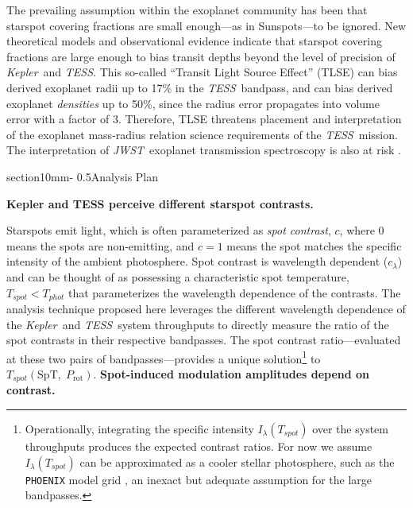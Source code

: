 \documentclass[letterpaper,12pt]{article}
\makeatletter
\renewcommand{\section}{\@startsection%
{section}{1}{0mm}{-\baselineskip}%
{0.5\baselineskip}{\normalfont\Large\bfseries}}%
\newcommand{\tess}{{\it TESS}}
\newcommand{\jwst}{{\it JWST}}
\newcommand{\kepler}{{\it Kepler}}
\makeatother
\begin{document}
The prevailing assumption within the exoplanet community has been that starspot covering fractions are small enough---as in Sunspots---to be ignored.  New theoretical models \cite{2018ApJ...853..122R} and observational evidence \cite{2016MNRAS.463.2494F} indicate that starspot covering fractions are large enough to bias transit depths beyond the level of precision of \kepler\ and \tess.  This so-called ``Transit Light Source Effect'' (TLSE) can bias derived exoplanet radii up to 17\% in the \tess\ bandpass, and can bias derived exoplanet \emph{densities} up to 50\%, since the radius error propagates into volume error with a factor of 3.  Therefore, TLSE threatens placement and interpretation of the exoplanet mass-radius relation science requirements of the \tess\ mission.  The interpretation of \jwst\ exoplanet transmission spectroscopy is also at risk \cite{2019AJ....157...11W}.

\section{Analysis Plan}

\textbf{Kepler and TESS perceive different starspot contrasts.}

Starspots emit light, which is often parameterized as \emph{spot contrast}, $c$, where 0 means the spots are non-emitting, and $c=1$ means the spot matches the specific intensity of the ambient photosphere.  Spot contrast is wavelength dependent ($c_\lambda$) and can be thought of as possessing a characteristic spot temperature, $T_{spot}<T_{phot}$ that parameterizes the wavelength dependence of the contrasts.  The analysis technique proposed here leverages the different wavelength dependence of the \kepler\ and \tess\ system throughputs to directly measure the ratio of the spot contrasts in their respective bandpasses.  The spot contrast ratio---evaluated at these two pairs of bandpasses---provides a unique solution\footnote{Operationally, integrating the specific intensity $I_\lambda(T_{spot})$ over the system throughputs produces the expected contrast ratios.  For now we assume $I_\lambda(T_{spot})$ can be approximated as a cooler stellar photosphere, such as the \texttt{PHOENIX} model grid \cite{2013A&A...553A...6H}, an inexact but adequate assumption for the large bandpasses.} to $T_{spot}(\mathrm{SpT},\;P_{\mathrm{rot}})$.  \newline \newline
\textbf{Spot-induced modulation amplitudes depend on contrast.}
\end{document}
